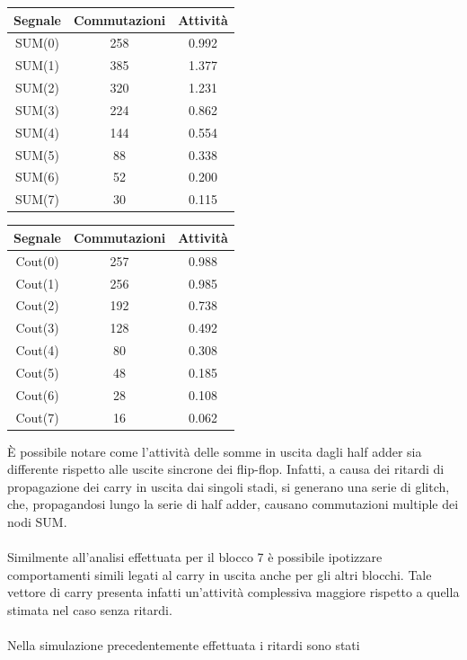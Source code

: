 \documentclass[11pt,  english, makeidx, a4paper, titlepage, oneside]{book}
\begin{document}
\begin{center}
	\begin{tabular}{|c|c|c|}
	\hline
	Segnale & Commutazioni & Attività \\ 
	\hline
	SUM(0) & 258  & 0.992  \\
	\hline
	SUM(1) & 385  & 1.377  \\
	\hline
	SUM(2) & 320  &  1.231  \\
	\hline
	SUM(3) & 224  & 0.862  \\
	\hline
	SUM(4) & 144  & 0.554  \\
	\hline
	SUM(5) & 88  & 0.338  \\
	\hline
	SUM(6) & 52  & 0.200  \\
	\hline
	SUM(7) & 30  & 0.115  \\
	\hline
	\end{tabular}	
	\begin{tabular}{|c|c|c|}
	\hline
	Segnale & Commutazioni & Attività \\ 
	\hline
	Cout(0) & 257  & 0.988  \\
	\hline
	Cout(1) & 256  & 0.985  \\
	\hline
	Cout(2) & 192  & 0.738  \\
	\hline
	Cout(3) & 128  & 0.492  \\
	\hline
	Cout(4) & 80  & 0.308  \\
	\hline
	Cout(5) & 48  & 0.185  \\
	\hline
	Cout(6) & 28  & 0.108  \\
	\hline
	Cout(7) & 16  & 0.062  \\
	\hline
	\end{tabular}
\end{center}
\vspace{0.3cm}
È possibile notare come l'attività delle somme in uscita dagli
half adder sia differente rispetto alle uscite sincrone dei flip-flop.
Infatti, a causa dei ritardi di propagazione dei carry in uscita dai 
singoli stadi, si generano una serie di glitch, che, propagandosi lungo
la serie di half adder, causano commutazioni multiple dei nodi SUM.
\\\\
Similmente all'analisi effettuata per il blocco 7 è possibile ipotizzare
comportamenti simili legati al carry in uscita anche per gli altri blocchi.
Tale vettore di carry presenta infatti un'attività complessiva maggiore 
rispetto a quella stimata nel caso senza ritardi.
\\\\
Nella simulazione precedentemente effettuata i ritardi sono stati
\end{document}
